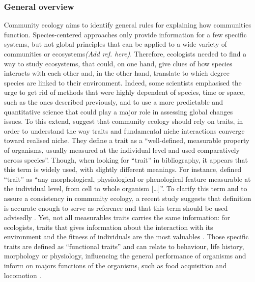 \subsubsection{General overview}
Community ecology aims to identify general rules for explaining how communities function. Species-centered approaches only provide information for a few specific systems, but not global principles that can be applied to a wide variety of communities or ecosystems\emph{(Add ref. here)}. Therefore, ecologists needed to find a way to study ecosystems, that could, on one hand, give clues of how species interacts with each other and, in the other hand, translate to which degree species are linked to their environment. Indeed, some scientists emphasised the urge to get rid of methods that were highly dependent of species, time or space, such as the ones described previously, and to use a more predictable and quantitative science that could play a major role in assessing global changes issues. To this extend, \citep{mcgill2006} suggest that community ecology should rely on traits, in order to understand the way traits and fundamental niche interactions converge toward realised niche. They define a trait as a “well-defined, measurable property of organisms, usually measured at the individual level and used comparatively across species”. Though, when looking for “trait” in bibliography, it appears that this term is widely used, with slightly different meanings. For instance, \citep{violle2007} defined “trait” as “any morphological, physiological or phenological feature measurable at the individual level, from cell to whole organism […]”. To clarify this term and to assure a consistency in community ecology, a recent study suggests that \citep{violle2007}definition is accurate enough to serve as reference and that this term should be used advisedly \citep{martini2020}. Yet, not all measurables traits carries the same information: for ecologists, traits that gives information about the interaction with its environment and the fitness of individuals are the most valuables \citep{kremer2017}. Those specific traits are defined as “functional traits” and can relate to behaviour, life history, morphology or physiology, influencing the general performance of organisms \citep{martini2020, mcgill2006} and inform on majors functions of the organisms, such as food acquisition and locomotion \citep{mejri2009}.

